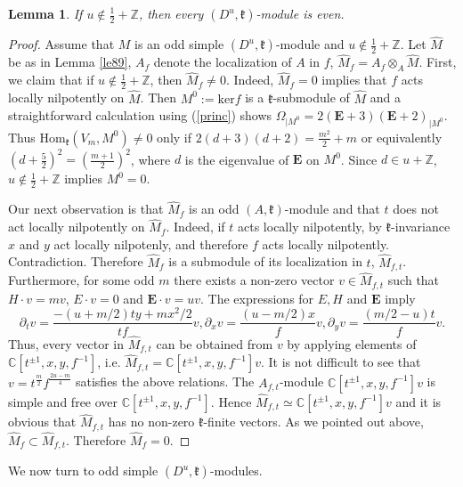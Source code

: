\documentclass[12pt]{amsart}
\theoremstyle{plain} %
\newtheorem{lemma}[definition]{Lemma}
\newcommand{\Ker}{\mathrm{ker}}
\renewcommand{\hom}{\mathrm{Hom}}
\newcommand {\ZZ} {\mathbb {Z}}
\newcommand {\CC} {\mathbb {C}}
\newcommand {\EE} {\mathbf {E}}
\newcommand{\kk}{\mathfrak{k}}
\newcommand{\refle}[1]{Lemma \ref{#1}}
\newcommand{\refeq}[1]{(\ref{#1})}
\begin{document}
\begin{lemma}\label{le104sl}
If $u\notin \frac {1}{2}+\ZZ$, then every $(D^u,\kk)$-module is even.
\end{lemma}
\begin{proof}
Assume that $M$ is an odd simple $(D^u,\kk)$-module and $u\notin \frac {1}{2}+\ZZ $. Let $\hat M$ be as in \refle{le89}, $A_f$ denote the localization of $A$ in $f$, $\hat{M}_f=A_f\otimes_A \hat{M}$. First, we claim that if  $u\notin \frac
{1}{2}+\ZZ$, then $\hat{M}_f\neq 0$. Indeed, $\hat{M}_f=0$ implies
that $f$ acts
locally nilpotently on $\hat{M}$.
Then $M^0:=\Ker f$ is a $\kk$-submodule of $\hat{M}$ and a
straightforward calculation using \refeq{princ} shows
$\Omega_{| M^0}=2(\EE+3)(\EE+2)_{| M^0}$. Thus $\hom_{\kk}(V_m,M^0)\neq 0$ only if $2(d+3)(d+2)=\frac{m^2}{2}+m$ or equivalently $(d+\frac{5}{2})^2=(\frac{m+1}{2})^2$, where $d$ is the eigenvalue of $\EE$ on $M^0$. Since $d\in u+\ZZ$, $u\notin \frac{1}{2}+\ZZ $ implies $M^0=0$.

Our next observation is that $\hat{M}_f$ is an odd $(A,\kk)$-module
and that $t$ does not act locally nilpotently on $\hat{M}_f$. Indeed, if $t$ acts locally nilpotently, by $\kk$-invariance $x$ and $y$ act locally nilpotenly, and therefore $f$ acts locally
nilpotently. Contradiction. Therefore  $\hat{M}_f$ is a submodule of its localization in $t$, $\hat{M}_{f,t}$. Furthermore, for some odd $m$ there
exists a non-zero vector $v\in \hat{M}_{f,t}$ such that $H\cdot v=m
v$, $E\cdot v=0$
and  $\EE\cdot v=uv$. The expressions for $E,H$ and $\EE$ imply
\[
\partial_t v=\frac{-(u+m/2)ty+mx^2/2}{tf} v, \partial_x v=\frac{(u-m/2)x}{f} v, \partial_y v=\frac{(m/2-u)t}{f} v.
\]
Thus, every vector in $\hat{M}_{f,t}$ can be obtained from $v$ by 
applying elements of $\CC[t^{\pm 1},x,y,f^{-1}]$, i.e.
$\hat{M}_{f,t}=\CC[t^{\pm 1},x,y,f^{-1}]v$. It is not difficult to see
that $v=t^{\frac{m}{2}}f^{\frac{2u-m}{4}}$ satisfies the above
relations. The $A_{f,t}$-module 
$\CC[t^{\pm 1},x,y,f^{-1}]v$ is simple and free over
$\CC[t^{\pm 1},x,y,f^{-1}]$. Hence
$\hat{M}_{f,t}\simeq \CC[t^{\pm 1},x,y,f^{-1}]v$ and it is
obvious that $\hat{M}_{f,t}$ has no non-zero $\kk$-finite
vectors. As we pointed out above, $\hat{M}_f\subset
\hat{M}_{f,t}$. Therefore $\hat{M}_f=0$.
\end{proof}

We now turn to odd simple $(D^u,\kk)$-modules.
\end{document}

